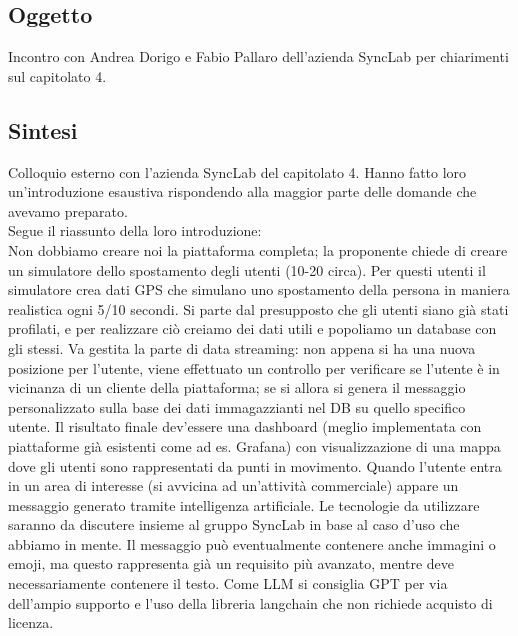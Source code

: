 \documentclass[12pt]{article}
\begin{document}
\subsection{Oggetto}
Incontro con Andrea Dorigo e Fabio Pallaro dell'azienda SyncLab per chiarimenti sul capitolato 4.\\ 
\subsection{Sintesi}
Colloquio esterno con l'azienda SyncLab del capitolato 4.
Hanno fatto loro un'introduzione esaustiva rispondendo alla maggior parte delle domande che avevamo preparato.\\
\vspace{2mm}
Segue il riassunto della loro introduzione:\\
\vspace{2mm}
Non dobbiamo creare noi la piattaforma completa; la proponente chiede di creare un simulatore dello spostamento degli utenti (10-20 circa). Per questi utenti il simulatore crea dati GPS che simulano uno spostamento della persona in maniera realistica ogni 5/10 secondi.\newline
Si parte dal presupposto che gli utenti siano già stati profilati, e per realizzare ciò creiamo dei dati utili e popoliamo un database con gli stessi.\newline 
Va gestita la parte di data streaming: non appena si ha una nuova posizione per l'utente, viene effettuato un controllo per verificare se l'utente è in vicinanza di un cliente della piattaforma; se si allora si genera il messaggio personalizzato sulla base dei dati immagazzianti nel DB su quello specifico utente.\newline
Il risultato finale dev'essere una dashboard (meglio implementata con piattaforme già esistenti come ad es. Grafana) con visualizzazione di una mappa dove gli utenti sono rappresentati da punti in movimento. Quando l'utente entra in un area di interesse (si avvicina ad un'attività commerciale) appare un messaggio generato tramite intelligenza artificiale. Le tecnologie da utilizzare saranno da discutere insieme al gruppo SyncLab in base al caso d'uso che abbiamo in mente.
Il messaggio può eventualmente contenere anche immagini o emoji, ma questo rappresenta già un requisito più avanzato, mentre deve necessariamente contenere il testo.\newline 
Come LLM si consiglia GPT per via dell'ampio supporto e l'uso della libreria langchain che non richiede acquisto di licenza.\newline
\end{document}

